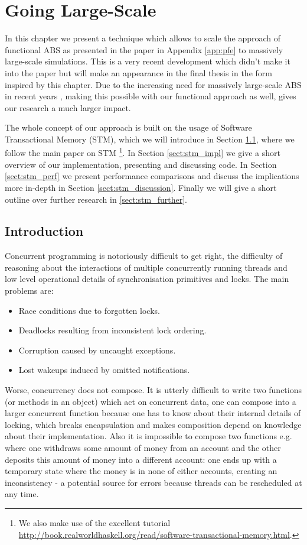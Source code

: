 \chapter{Going Large-Scale}
\label{chap:stm}

In this chapter we present a technique which allows to scale the approach of functional ABS as presented in the paper in Appendix \ref{app:pfe} to massively large-scale simulations. This is a very recent development which didn't make it into the paper but will make an appearance in the final thesis in the form inspired by this chapter. Due to the increasing need for massively large-scale ABS in recent years \cite{lysenko_framework_2008}, making this possible with our functional approach as well, gives our research a much larger impact.

The whole concept of our approach is built on the usage of Software Transactional Memory (STM), which we will introduce in Section \ref{sect:stm_intro}, where we follow the main paper \cite{harris_composable_2005} on STM \footnote{We also make use of the excellent tutorial \url{http://book.realworldhaskell.org/read/software-transactional-memory.html}.}. In Section \ref{sect:stm_impl} we give a short overview of our implementation, presenting and discussing code. In Section \ref{sect:stm_perf} we present performance comparisons and discuss the implications more in-depth in Section \ref{sect:stm_discussion}. Finally we will give a short outline over further research in \ref{sect:stm_further}.

\section{Introduction}
\label{sect:stm_intro}
Concurrent programming is notoriously difficult to get right, the difficulty of reasoning about the interactions of multiple concurrently running threads and low level operational details of synchronisation primitives and locks. The main problems are:

\begin{itemize}
	\item Race conditions due to forgotten locks.
	\item Deadlocks resulting from inconsistent lock ordering.
	\item Corruption caused by uncaught exceptions.
	\item Lost wakeups induced by omitted notifications.
\end{itemize}

Worse, concurrency does not compose. It is utterly difficult to write two functions (or methods in an object) which act on concurrent data, one can compose into a larger concurrent function because one has to know about their internal details of locking, which breaks encapsulation and makes composition depend on knowledge about their implementation. Also it is impossible to compose two functions e.g. where one withdraws some amount of money from an account and the other deposits this amount of money into a different account: one ends up with a temporary state where the money is in none of either accounts, creating an inconsistency - a potential source for errors because threads can be rescheduled at any time.

